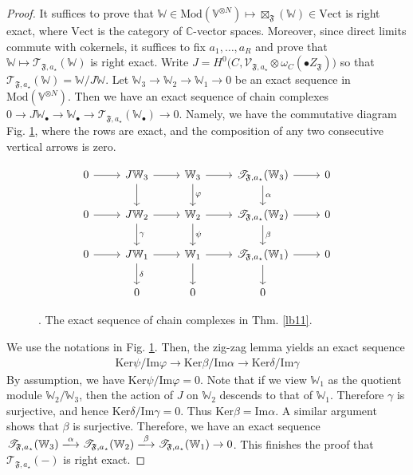 \documentclass[11pt,b5paper,notitlepage]{article}
\theoremstyle{definition}
\theoremstyle{plain}
\newcommand{\SV}{\mathscr{V}}
\newcommand{\blt}{\bullet}
\newcommand{\Vbb}{\mathbb V}
\newcommand{\Wbb}{\mathbb W}
\newcommand{\Cbb}{\mathbb C}
\newcommand{\Ker}{\mathrm{Ker}}
\newcommand{\<}{\left\langle}
\renewcommand{\>}{\right\rangle}
\newcommand{\ST}{\mathscr{T}}
\newcommand{\Mod}{\mathrm{Mod}}
\newcommand{\ff}{\mathfrak{F}}
\newcommand{\Imag}{\mathrm{Im}}
\numberwithin{equation}{section}
\begin{document}
\begin{proof}
It suffices to prove that $\Wbb\in\Mod(\Vbb^{\otimes N})\mapsto\boxtimes_\ff(\Wbb)\in\mathrm{Vect}$ is right exact, where $\mathrm{Vect}$ is the category of $\Cbb$-vector spaces. Moreover, since direct limits commute with cokernels, it suffices to fix $a_1,\dots,a_R$ and prove that $\Wbb\mapsto \ST_{\ff,a_\star}(\Wbb)$ is right exact. Write $J=H^0\big(C,\SV_{\ff,a_\star}\otimes \omega_{C}(\blt Z_\ff)\big)$ so that $\ST_{\ff,a_\star}(\Wbb)=\Wbb/J\Wbb$.  Let $\Wbb_3\rightarrow\Wbb_2\rightarrow\Wbb_1\rightarrow 0$ be an exact sequence in $\Mod(\Vbb^{\otimes N})$. Then we have an exact sequence of chain complexes $0\rightarrow J\Wbb_\blt\rightarrow \Wbb_\blt\rightarrow \ST_{\ff,a_\star}(\Wbb_\blt)\rightarrow0$. Namely, we have the commutative diagram Fig. \ref{fig1}, where the rows are exact, and the composition of any two consecutive vertical arrows is zero.
\begin{figure}[h]
	\centering
\begin{equation*}
\begin{tikzcd}
0 \arrow[r] & J\Wbb_3 \arrow[r] \arrow[d] & \Wbb_3 \arrow[r] \arrow[d,"\varphi"] & \ST_{\ff,a_\star}(\Wbb_3) \arrow[r] \arrow[d,"\alpha"] & 0 \\
0 \arrow[r] & J\Wbb_2 \arrow[r] \arrow[d,"\gamma"] & \Wbb_2 \arrow[r] \arrow[d,"\psi"] & \ST_{\ff,a_\star}(\Wbb_2) \arrow[r] \arrow[d,"\beta"] & 0 \\
0 \arrow[r] & J\Wbb_1 \arrow[r] \arrow[d,"\delta"] & \Wbb_1 \arrow[r] \arrow[d] & \ST_{\ff,a_\star}(\Wbb_1) \arrow[r] \arrow[d] & 0 \\
            & 0                     & 0                     & 0                     &  
\end{tikzcd}
\end{equation*}
	\caption{. The exact sequence of chain complexes in Thm. \ref{lb11}.}
	\label{fig1}
\end{figure} 

We use the notations in Fig. \ref{fig1}. Then, the zig-zag lemma yields an exact sequence
\begin{align*}
\Ker\psi/\Imag\varphi\rightarrow \Ker\beta/\Imag\alpha\rightarrow\Ker\delta/\Imag\gamma
\end{align*}
By assumption, we have $\Ker\psi/\Imag\varphi=0$. Note that if we view $\Wbb_1$ as the quotient module $\Wbb_2/\Wbb_3$, then the action of $J$ on $\Wbb_2$ descends to that of $\Wbb_1$. Therefore $\gamma$ is surjective, and hence $\Ker\delta/\Imag\gamma=0$. Thus $\Ker\beta=\Imag\alpha$. A similar argument shows that $\beta$ is surjective. Therefore, we have an exact sequence $\ST_{\ff,a_\star}(\Wbb_3)\xlongrightarrow{\alpha}\ST_{\ff,a_\star}(\Wbb_2)\xlongrightarrow{\beta}\ST_{\ff,a_\star}(\Wbb_1)\rightarrow0$. This finishes the proof that $\ST_{\ff,a_\star}(-)$ is right exact.
\end{proof}
\end{document}
